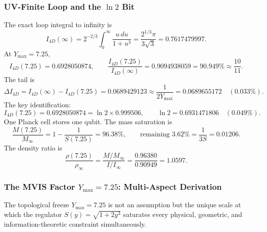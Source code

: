 \documentclass[a4paper,1pt,oneside,openany]{book}
\begin{document}
\subsubsection{UV-Finite Loop and the \(\ln 2\) Bit}
\label{sssec:ln2_bit}
The exact loop integral to infinity is
\begin{equation}
I_{4D}(\infty) = 2^{-2/3}\int_0^\infty \frac{u\,du}{1+u^3} = \frac{2^{1/3}\pi}{3\sqrt{3}} = 0.7617479997.
\label{eq:I_inf}
\end{equation}
At \(Y_{\max} = 7.25\),
\begin{equation}
I_{4D}(7.25) = 0.6928050874, \qquad \frac{I_{4D}(7.25)}{I_{4D}(\infty)} = 0.9094938059 = 90.949\% \approx \frac{10}{11}.
\label{eq:I_725}
\end{equation}
The tail is
\begin{equation}
\Delta I_{4D} = I_{4D}(\infty) - I_{4D}(7.25) = 0.0689429123 \approx \frac{1}{2Y_{\max}} = 0.0689655172 \quad (0.033\%).
\label{eq:tail}
\end{equation}
The key identification:
\begin{equation}
I_{4D}(7.25) = 0.6928050874 = \ln 2 \times 0.999506, \qquad \ln 2 = 0.6931471806 \quad (0.049\%).
\label{eq:ln2_identification}
\end{equation}
One Planck cell stores one qubit. The mass saturation is
\begin{equation}
\frac{M(7.25)}{M_\infty} = 1 - \frac{1}{S(7.25)} = 96.38\%, \qquad \text{remaining } 3.62\% = \frac{1}{3S} = 0.01206.
\label{eq:mass_saturation}
\end{equation}
The density ratio is
\begin{equation}
\frac{\rho(7.25)}{\rho_\infty} = \frac{M/M_\infty}{I/I_\infty} = \frac{0.96380}{0.90949} = 1.0597.
\label{eq:density_ratio}
\end{equation}

\subsubsection{The MVIS Factor \(Y_{\max} = 7.25\): Multi-Aspect Derivation}
\label{sssec:mvis_derivation}

The topological freeze \(Y_{\max} = 7.25\) is not an assumption but the unique scale at which the regulator \(S(y) = \sqrt{1+2y^3}\) saturates every physical, geometric, and information-theoretic constraint simultaneously.
\end{document}
